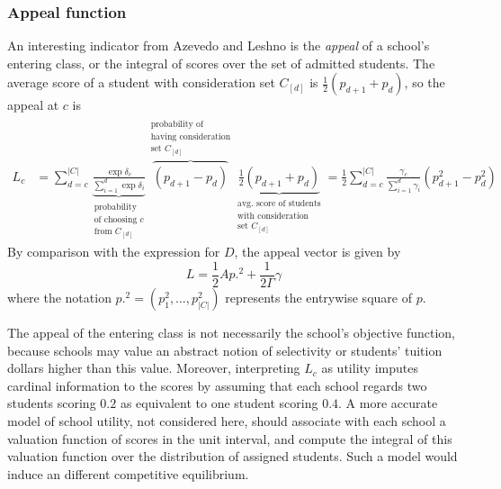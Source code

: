 \documentclass[12pt]{article}
\theoremstyle{definition}
\begin{document}
\subsubsection{Appeal function}
An interesting indicator from Azevedo and Leshno \parencite*{supplydemandfw} is the \emph{appeal} of a school's entering class, or the integral of scores over the set of admitted students. The average score of a student with consideration set $C_{[d]}$ is $\frac{1}{2}\left(p_{d+1} + p_d\right)$, so the appeal at $c$ is
\begin{align}
L_c &= \sum_{d=c}^{|C|} 
\underbrace{\frac{\exp{\delta_c}}{ \sum_{i=1}^d \exp{\delta_i}}}_{\substack{\text{probability} \\ \text{of choosing } c \\ \text{from }C_{[d]}}} 
\overbrace{\left(p_{d+1} - p_{d}\right)}^{\substack{\text{probability of}\\ \text{having consideration} \\ \text{set }C_{[d]}}} 
\underbrace{\frac{1}{2}\left(p_{d+1} + p_{d}\right)}_{\substack{\text{avg. score of students}\\ \text{with consideration} \\ \text{set }C_{[d]}}}
=\frac{1}{2}\sum_{d=c}^{|C|} 
\frac{{\gamma_c}}{ \sum_{i=1}^d {\gamma_i}} 
\left(p_{d+1}^2 -  p_{d}^2\right)
\end{align}
By comparison with the expression for $D$, the appeal vector is given by 
\[L = \frac{1}{2} A p.^2 + \frac{1}{2\Gamma} \gamma\]
where the notation $p.^2 = (p_1^2, \dots, p_{|C|}^2)$ represents the entrywise square of $p$.

The appeal of the entering class is not necessarily the school's objective function, because schools may value an abstract notion of selectivity or students' tuition dollars higher than this value. Moreover, interpreting $L_c$ as utility imputes cardinal information to the scores by assuming that each school regards two students scoring $0.2$ as equivalent to one student scoring $0.4$. A more accurate model of school utility, not considered here, should associate with each school a valuation function of scores in the unit interval, and compute the integral of this valuation function over the distribution of assigned students. Such a model would induce an different competitive equilibrium.
\end{document}
